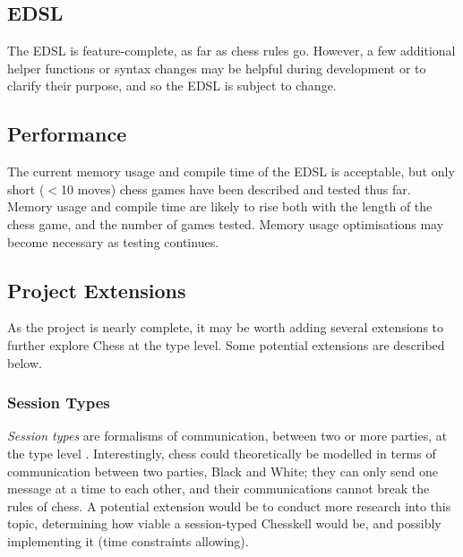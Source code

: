 \documentclass[12pt, a4paper, bibliography=totocnumbered]{scrartcl}
\begin{document}

\subsection{EDSL}

The EDSL is feature-complete, as far as chess rules go. However, a few additional helper functions or syntax changes may be helpful during development or to clarify their purpose, and so the EDSL is subject to change.

\subsection{Performance}

The current memory usage and compile time of the EDSL is acceptable, but only short ($<$10 moves) chess games have been described and tested thus far. Memory usage and compile time are likely to rise both with the length of the chess game, and the number of games tested. Memory usage optimisations may become necessary as testing continues.

\subsection{Project Extensions}

As the project is nearly complete, it may be worth adding several extensions to further explore Chess at the type level. Some potential extensions are described below.

\subsubsection{Session Types}

\emph{Session types} are formalisms of communication, between two or more parties, at the type level \cite{torinosessions}. Interestingly, chess could theoretically be modelled in terms of communication between two parties, Black and White; they can only send one message at a time to each other, and their communications cannot break the rules of chess. A potential extension would be to conduct more research into this topic, determining how viable a session-typed Chesskell would be, and possibly implementing it (time constraints allowing).
\end{document}
